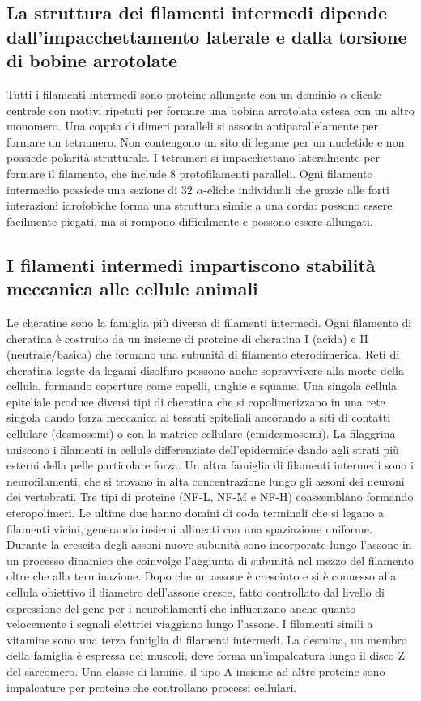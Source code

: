 \subsection{La struttura dei filamenti intermedi dipende dall'impacchettamento laterale e dalla torsione di bobine arrotolate}
Tutti i filamenti intermedi sono proteine allungate con un dominio $\alpha$-elicale centrale con motivi ripetuti per formare una bobina arrotolata estesa con un altro monomero. Una
coppia di dimeri paralleli si associa antiparallelamente per formare un tetramero. Non contengono un sito di legame per un nucletide e non possiede polarit\`a strutturale. I tetrameri
si impacchettano lateralmente per formare il filamento, che include $8$ protofilamenti paralleli. Ogni filamento intermedio possiede una sezione di $32$ $\alpha$-eliche individuali che
grazie alle forti interazioni idrofobiche forma una struttura simile a una corda: possono essere facilmente piegati, ma si rompono difficilmente e possono essere allungati. 
\subsection{I filamenti intermedi impartiscono stabilit\`a meccanica alle cellule animali}
Le cheratine sono la famiglia pi\`u diversa di filamenti intermedi. Ogni filamento di cheratina \`e costruito da un insieme di proteine di cheratina I (acida) e II (neutrale/basica) che
formano una subunit\`a di filamento eterodimerica. Reti di cheratina legate da legami disolfuro possono anche sopravvivere alla morte della cellula, formando coperture come 
capelli, unghie e squame. Una singola cellula epiteliale produce diversi tipi di cheratina che si copolimerizzano in una rete singola dando forza meccanica ai tessuti epiteliali 
ancorando  a siti di contatti cellulare (desmosomi) o con la matrice cellulare (emidesmosomi). La filaggrina uniscono i filamenti in cellule differenziate dell'epidermide dando agli 
strati pi\`u esterni della pelle particolare forza. Un altra famiglia di filamenti intermedi sono i neurofilamenti, che si trovano in alta concentrazione lungo gli assoni dei neuroni
dei vertebrati. Tre tipi di proteine (NF-L, NF-M e NF-H) coassemblano formando eteropolimeri. Le ultime due hanno domini di coda  terminali che si legano a filamenti vicini, 
generando insiemi allineati con una spaziazione uniforme. Durante la crescita degli assoni nuove subunit\`a sono incorporate lungo l'assone in un processo dinamico che coinvolge
l'aggiunta di subunit\`a nel mezzo del filamento oltre che alla terminazione. Dopo che un assone \`e cresciuto e si \`e connesso alla cellula obiettivo il diametro dell'assone cresce, 
fatto controllato dal livello di espressione del gene per i neurofilamenti che influenzano anche quanto velocemente i segnali elettrici viaggiano lungo l'assone. I filamenti simili a 
vitamine sono una terza famiglia di filamenti intermedi. La desmina, un membro della famiglia \`e espressa nei muscoli, dove forma un'impalcatura lungo il disco Z del sarcomero. Una 
classe di lamine, il tipo A insieme ad altre proteine sono impalcature per proteine che controllano processi cellulari. 
